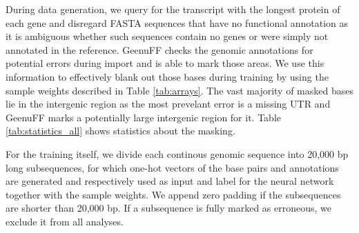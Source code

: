 \documentclass{bioinfo}
\begin{document}
\begin{methods}
\begin{table}[!htb]
\label{tab:arrays}
\end{table}

During data generation, we query for the transcript with the longest protein of each gene and 
disregard FASTA sequences that have no functional annotation as it is ambiguous
whether such sequences contain no genes or were simply not annotated in the reference. GeenuFF checks the 
genomic annotations for potential errors during import and is able to mark those 
areas. We use this information to effectively blank out those bases during training 
by using the sample weights described in Table \ref{tab:arrays}. The vast majority 
of masked bases lie in the intergenic region as the most prevelant error is a 
missing UTR and GeenuFF marks a potentially large intergenic region for it. Table 
\ref{tab:statistics_all} shows statistics about the masking. 

For the training itself, we divide each continous genomic sequence into 20,000 bp 
long subsequences, for which one-hot vectors of the base pairs and annotations 
are generated and respectively used as input and label for the neural network 
together with the sample weights. We append zero padding if the subsequences  
are shorter than 20,000 bp. 
If a subsequence is fully marked as erroneous, we exclude it from all analyses. 


\end{methods}
\end{document}
